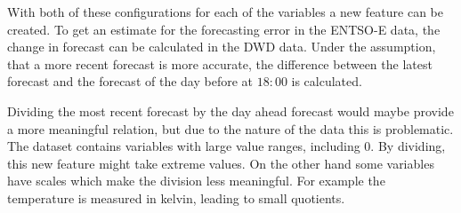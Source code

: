 \documentclass[class=scrbook, crop=false]{standalone}
\begin{document}
    With both of these configurations for each of the variables a new feature can be created. 
    To get an estimate for the forecasting error in the ENTSO-E data, the change in forecast can be calculated in the DWD data.
    Under the assumption, that a more recent forecast is more accurate, the difference between the latest forecast and the forecast of the day before at $18:00$ is calculated. 
    
    Dividing the most recent forecast by the day ahead forecast would maybe provide a more meaningful relation, but due to the nature of the data this is problematic.
    The dataset contains variables with large value ranges, including 0. 
    By dividing, this new feature might take extreme values.
    On the other hand some variables have scales which make the division less meaningful.
    For example the temperature is measured in kelvin, leading to small quotients.

    
\end{document}
